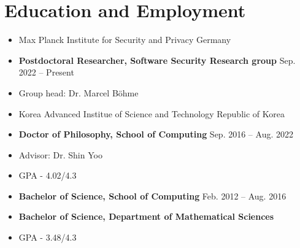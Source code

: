 \documentclass[letterpaper,11pt]{article}
\makeatletter
\newcommand{\resumeSubheading}[4]{
  \vspace{-2pt}\item
    \begin{tabular*}{1.0\textwidth}[t]{l@{\extracolsep{\fill}}r}
      \textbf{#1} & \textbf{\small #2} \\
      \textit{\small#3} & \textit{\small #4} \\
    \end{tabular*}\vspace{-7pt}
}
\newcommand{\resumeSubHeadingListStart}{\begin{itemize}[leftmargin=0.0in, label={}]}
\newcommand{\resumeSubHeadingListEnd}{\end{itemize}}
\makeatother
\begin{document}
\section{Education and Employment}
\resumeSubHeadingListStart
\vspace{-2pt}
\item Max Planck Institute for Security and Privacy \hfill Germany \vspace{-2pt}
\vspace{-2pt} \item \hspace{10pt} \textbf{Postdoctoral Researcher, Software Security Research group} \hfill  Sep. 2022 -- Present
\vspace{-5pt} \item \hspace{20pt} Group head: Dr. Marcel Böhme

\vspace{-2pt}
\item Korea Advanced Institue of Science and Technology \hfill Republic of Korea \vspace{-2pt}
\vspace{-2pt} \item \hspace{10pt} \textbf{Doctor of Philosophy, School of Computing} \hfill  Sep. 2016 -- Aug. 2022
\vspace{-5pt} \item \hspace{20pt} Advisor: Dr. Shin Yoo
\vspace{-5pt} \item \hspace{20pt} GPA - 4.02/4.3

\vspace{-2pt} \item \hspace{10pt} \textbf{Bachelor of Science, School of Computing} \hfill  Feb. 2012 -- Aug. 2016
\vspace{-5pt} \item \hspace{10pt} \textbf{Bachelor of Science, Department of Mathematical Sciences}
\vspace{-5pt} \item \hspace{20pt} GPA - 3.48/4.3
\resumeSubHeadingListEnd
\end{document}
